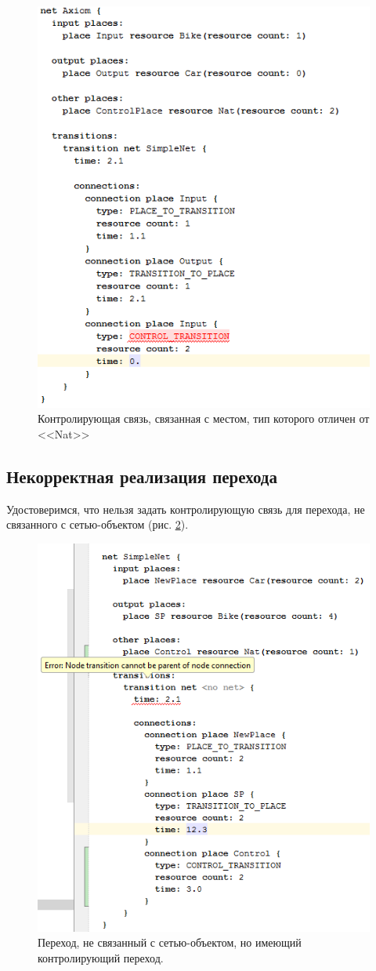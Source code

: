 			\begin{figure}[th]
				\centering
				\includegraphics[width=0.7\linewidth]{images/test-project/control-connection}
				\caption{Контролирующая связь, связанная с местом, тип которого отличен от <<Nat>>}
				\label{fig:control-connection}
			\end{figure}
			\FloatBarrier
			\clearpage
		
			\subsection{Некорректная реализация перехода}
			Удостоверимся, что нельзя задать контролирующую связь для перехода, не связанного с сетью-объектом (рис. \ref{fig:control-without-net}).
			\begin{figure}[th]
				\centering
				\includegraphics[width=0.7\linewidth]{images/test-project/control-without-net}
				\caption{Переход, не связанный с сетью-объектом, но имеющий контролирующий переход.}
				\label{fig:control-without-net}
			\end{figure}
		
	

